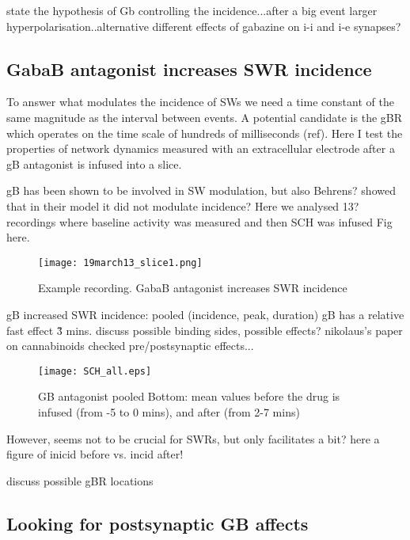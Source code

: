     state the hypothesis of Gb controlling the incidence...after a big event
    larger hyperpolarisation..alternative different effects of gabazine on i-i
    and i-e synapses?

  \subsection{GabaB antagonist increases SWR incidence}
    To answer what modulates the incidence of SWs we need a time constant of
    the same magnitude as the interval between events. A potential candidate is
    the gBR which operates on the time scale of hundreds of milliseconds (ref).
    Here I test the properties of network dynamics measured with an
    extracellular electrode after a gB antagonist is infused into a slice.

    gB has been shown to be involved in SW modulation, but also Behrens? showed
    that in their model it did not modulate incidence?  Here we analysed 13?
    recordings where baseline activity was measured and then SCH was infused
    Fig here.

      \begin{figure}
        \texttt{[image: 19march13\_slice1.png]}
        \caption{ Example recording. GabaB antagonist increases SWR incidence 
                }
      \end{figure}

    gB increased SWR incidence: pooled (incidence, peak, duration)
    gB has a relative fast effect \~ 3 mins.
    discuss possible binding sides, possible effects?
    nikolaus's paper on cannabinoids checked pre/postsynaptic effects... 

    \begin{figure}
    \texttt{[image: SCH\_all.eps]}
    \caption{GB antagonist pooled
              Bottom: mean values before the drug is infused (from -5 to 0 mins), and after (from 2-7 mins)
            }
    \end{figure}
    
    However, seems not to be crucial for SWRs, but only facilitates a bit?
    here a figure of inicid before vs. incid after!

    discuss possible gBR locations

  \subsection{Looking for postsynaptic GB affects}

